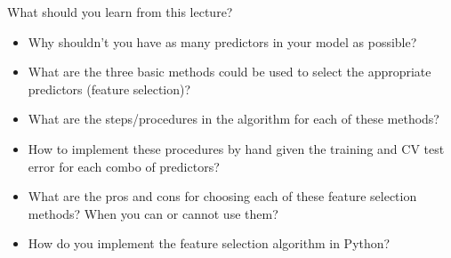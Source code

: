 \documentclass[aspectratio=169,usenames,dvipsnames]{beamer}
\begin{document}

\begin{frame}[t]{What should you learn from this lecture?}
	\begin{itemize}
		\item Why shouldn't you have as many predictors in your model as possible? 
		\item What are the three basic methods could be used to select the appropriate predictors (feature selection)? 
		\item What are the steps/procedures in the algorithm for each of these methods? 
		\item How to implement these procedures by hand given the training and CV test error for each combo of predictors? 
		\item What are the pros and cons for choosing each of these feature selection methods? When you can or cannot use them?
		\item How do you implement the feature selection algorithm in Python?
	\end{itemize}
\end{frame}
\end{document}
